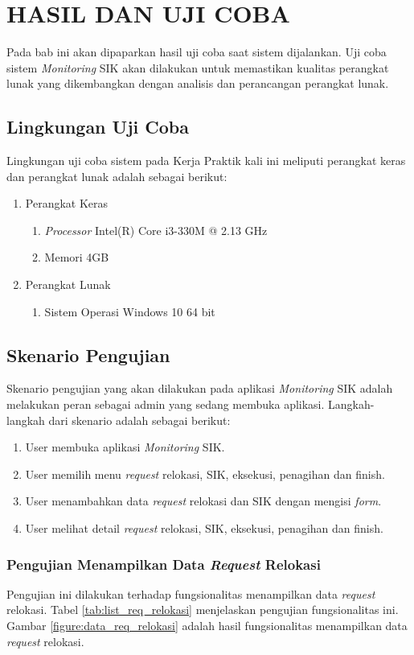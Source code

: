 \chapter{HASIL DAN UJI COBA}
\tab Pada bab ini akan dipaparkan hasil uji coba saat sistem dijalankan. Uji coba sistem \textit{Monitoring} SIK akan dilakukan untuk memastikan kualitas perangkat lunak yang dikembangkan dengan analisis dan perancangan perangkat lunak.

\section{Lingkungan Uji Coba}
Lingkungan uji coba sistem pada Kerja Praktik kali ini meliputi perangkat keras dan perangkat lunak adalah sebagai berikut:
\begin{enumerate}
\item Perangkat Keras
	\begin{enumerate}
	\item \textit{Processor} Intel(R) Core i3-330M @ 2.13 GHz
	\item Memori 4GB
	\end{enumerate}
\item Perangkat Lunak
	\begin{enumerate}
	\item Sistem Operasi Windows 10 64 bit
	\end{enumerate}
\end{enumerate}

\section{Skenario Pengujian}
Skenario pengujian yang akan dilakukan pada aplikasi \textit{Monitoring} SIK adalah melakukan peran sebagai admin yang sedang membuka aplikasi. Langkah-langkah dari skenario adalah sebagai berikut:
	\begin{enumerate}
	\item User membuka aplikasi \textit{Monitoring} SIK.
	\item User memilih menu \textit{request} relokasi, SIK, eksekusi, penagihan dan finish.
	\item User menambahkan data \textit{request} relokasi dan SIK dengan mengisi \textit{form}.
	\item User melihat detail \textit{request} relokasi, SIK, eksekusi, penagihan dan finish.
	\end{enumerate}
\subsection{Pengujian Menampilkan Data \textit{Request} Relokasi}
Pengujian ini dilakukan terhadap fungsionalitas menampilkan data \textit{request} relokasi. Tabel \ref{tab:list_req_relokasi} menjelaskan pengujian fungsionalitas ini. Gambar \ref{figure:data_req_relokasi} adalah hasil fungsionalitas menampilkan data \textit{request} relokasi.

